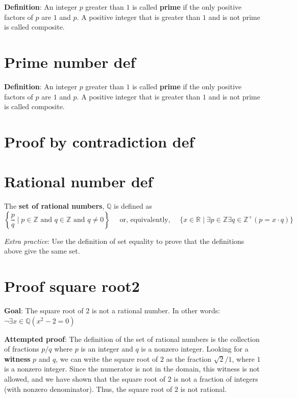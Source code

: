 \documentclass[12pt, oneside]{article}
\begin{document}
{\bf Definition}:  An integer $p$ greater than $1$ is called {\bf prime} if the only positive factors of 
$p$ are $1$ and $p$. A positive integer that is greater than $1$ and is not prime is called composite. 
 \vfill
\section*{Prime number def}


{\bf Definition}:  An integer $p$ greater than $1$ is called {\bf prime} if the only positive factors of 
$p$ are $1$ and $p$. A positive integer that is greater than $1$ and is not prime is called composite. 
 \vfill
\section*{Proof by contradiction def}



 \vfill
\section*{Rational number def}


The {\bf set  of rational numbers}, $\mathbb{Q}$  is defined as 
\[
\left\{ \frac{p}{q} \mid p \in \mathbb{Z}  \text{ and  } q  \in \mathbb{Z} \text{ and } q \neq  0 \right\}
\text{~~~~or, equivalently,~~~~}
\{ x  \in  \mathbb{R} \mid \exists p \in \mathbb{Z}  \exists q \in \mathbb{Z}^+ ( p =  x \cdot q) \}
\]

{\it Extra practice}: Use the definition of set equality to prove that the definitions above  give the same set.

 \vfill
\section*{Proof square root2}


{\bf Goal}:  The square root of $2$ is not a rational number.  In other words: $\neg \exists x \in \mathbb{Q} ( x^2 -  2 = 0)$

{\bf Attempted proof}: The definition of the set of rational numbers is the collection of fractions $p/q$ where $p$ is an integer and $q$ is a nonzero integer. Looking for a {\bf witness} $p$ and $q$, we can write the square root of $2$ as the fraction 
$\sqrt{2 }/1$, where $1$ is a nonzero integer. Since the numerator is not in the domain, this witness is not allowed, and we have shown that the square root of $2$ is not a fraction of integers (with nonzero denominator). Thus, the square root of $2$ is not rational.
\end{document}
